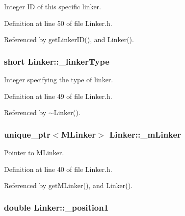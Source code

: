 Integer I\+D of this specific linker. 



Definition at line 50 of file Linker.\+h.



Referenced by get\+Linker\+I\+D(), and Linker().

\hypertarget{classLinker_a82213082aecfbbb0e69be04ae9357b68}{
\subsubsection[{\+\_\+linker\+Type}]{\setlength{\rightskip}{0pt plus 5cm}short Linker\+::\+\_\+linker\+Type\hspace{0.3cm}{\ttfamily [private]}}}\label{classLinker_a82213082aecfbbb0e69be04ae9357b68}


Integer specifying the type of linker. 



Definition at line 49 of file Linker.\+h.



Referenced by $\sim$\+Linker().

\hypertarget{classLinker_a0b17c705cb1e5f89777f2675bd857e1c}{
\subsubsection[{\+\_\+m\+Linker}]{\setlength{\rightskip}{0pt plus 5cm}unique\+\_\+ptr$<${\bf M\+Linker}$>$ Linker\+::\+\_\+m\+Linker\hspace{0.3cm}{\ttfamily [private]}}}\label{classLinker_a0b17c705cb1e5f89777f2675bd857e1c}


Pointer to \hyperlink{classMLinker}{M\+Linker}. 



Definition at line 40 of file Linker.\+h.



Referenced by get\+M\+Linker(), and Linker().

\hypertarget{classLinker_ad16ab7afce0a3a09b455f3407a382bf2}{
\subsubsection[{\+\_\+position1}]{\setlength{\rightskip}{0pt plus 5cm}double Linker\+::\+\_\+position1\hspace{0.3cm}{\ttfamily [private]}}}\label{classLinker_ad16ab7afce0a3a09b455f3407a382bf2}



